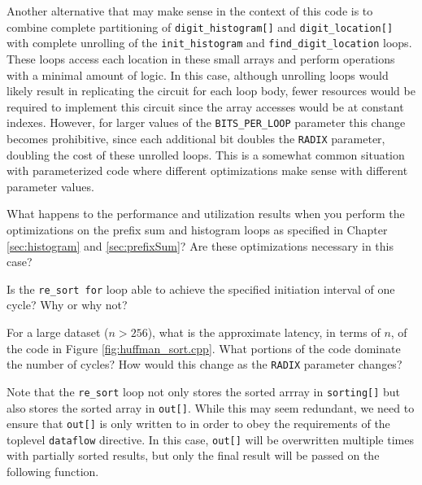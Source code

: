 Another alternative that may make sense in the context of this code is to combine complete partitioning of \lstinline{digit_histogram[]} and \lstinline{digit_location[]} with complete unrolling of the \lstinline{init_histogram} and \lstinline{find_digit_location} loops.   These loops access each location in these small arrays and perform operations with a minimal amount of logic.  In this case, although unrolling loops would likely result in replicating the circuit for each loop body, fewer resources would be required to implement this circuit since the array accesses would be at constant indexes.  However, for larger values of the \lstinline{BITS_PER_LOOP} parameter this change becomes prohibitive, since each additional bit doubles the \lstinline{RADIX} parameter, doubling the cost of these unrolled loops.  This is a somewhat common situation with parameterized code where different optimizations make sense with different parameter values.

\begin{exercise}
What happens to the performance and utilization results when you perform the optimizations on the prefix sum and histogram loops as specified in Chapter \ref{sec:histogram} and \ref{sec:prefixSum}?  Are these optimizations necessary in this case?
\end{exercise}

\begin{exercise}
Is the \lstinline{re_sort for} loop able to achieve the specified initiation interval of one cycle? Why or why not?
\end{exercise}

\begin{exercise}
For a large dataset ($n > 256$), what is the approximate latency, in terms of $n$, of the code in Figure \ref{fig:huffman_sort.cpp}.  What portions of the code dominate the number of cycles?  How would this change as the \lstinline{RADIX} parameter changes?
\end{exercise}

Note that the \lstinline{re_sort} loop not only stores the sorted arrray in \lstinline{sorting[]} but also stores the sorted array in \lstinline{out[]}.  While this may seem redundant, we need to ensure that \lstinline{out[]} is only written to in order to obey the requirements of the toplevel \lstinline{dataflow} directive.  In this case, \lstinline{out[]} will be overwritten multiple times with partially sorted results, but only the final result will be passed on the following function.

